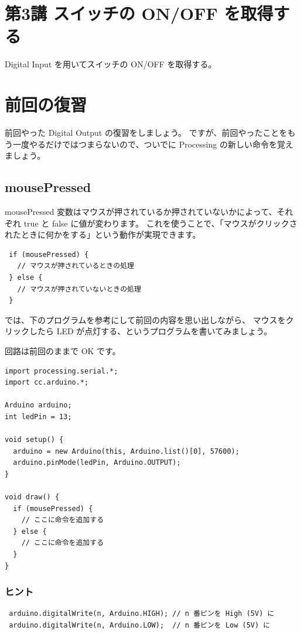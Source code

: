 \documentclass[11pt,a4paper]{jarticle}
\begin{document}
\section*{\LARGE{第3講 スイッチの ON/OFF を取得する}}
Digital Input を用いてスイッチの ON/OFF を取得する。


\section{前回の復習}
前回やった Digital Output の復習をしましょう。
ですが、前回やったことをもう一度やるだけではつまらないので、ついでに Processing の新しい命令を覚えましょう。

\subsection*{mousePressed}
mousePressed 変数はマウスが押されているか押されていないかによって、それぞれ true と false に値が変わります。
これを使うことで、「マウスがクリックされたときに何かをする」という動作が実現できます。

\begin{lstlisting}
 if (mousePressed) {
   // マウスが押されているときの処理
 } else {
   // マウスが押されていないときの処理
 }
\end{lstlisting}

では、下のプログラムを参考にして前回の内容を思い出しながら、
マウスをクリックしたら LED が点灯する、というプログラムを書いてみましょう。

回路は前回のままで OK です。

\begin{lstlisting}
import processing.serial.*;
import cc.arduino.*;
 
Arduino arduino;
int ledPin = 13;
 
void setup() {
  arduino = new Arduino(this, Arduino.list()[0], 57600);
  arduino.pinMode(ledPin, Arduino.OUTPUT);
}
 
void draw() {
  if (mousePressed) {
    // ここに命令を追加する
  } else {
    // ここに命令を追加する
  }
}
\end{lstlisting}

\subsubsection*{ヒント}
\begin{lstlisting}
 arduino.digitalWrite(n, Arduino.HIGH); // n 番ピンを High (5V) に
 arduino.digitalWrite(n, Arduino.LOW);  // n 番ピンを Low (5V) に
\end{lstlisting}
\end{document}
